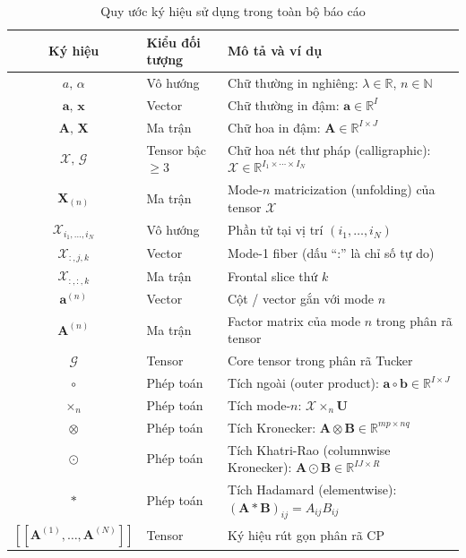 \begin{table}[H]
\centering
\caption{Quy ước ký hiệu sử dụng trong toàn bộ báo cáo}
\label{tab:notation}
\renewcommand{\arraystretch}{1.35}
\begin{tabular}{clL{7.2cm}}
\toprule
\textbf{Ký hiệu} & \textbf{Kiểu đối tượng} & \textbf{Mô tả và ví dụ} \\
\midrule
$a,\, \alpha$ & Vô hướng & Chữ thường in nghiêng: $\lambda \in \mathbb{R}$, $n \in \mathbb{N}$ \\
$\mathbf{a},\, \mathbf{x}$ & Vector & Chữ thường in đậm: $\mathbf{a} \in \mathbb{R}^I$ \\
$\mathbf{A},\, \mathbf{X}$ & Ma trận & Chữ hoa in đậm: $\mathbf{A} \in \mathbb{R}^{I \times J}$ \\
$\mathcal{X},\, \mathcal{G}$ & Tensor bậc $\geq 3$ & Chữ hoa nét thư pháp (calligraphic): $\mathcal{X} \in \mathbb{R}^{I_1 \times \cdots \times I_N}$ \\
\addlinespace
$\mathbf{X}_{(n)}$ & Ma trận & Mode-$n$ matricization (unfolding) của tensor $\mathcal{X}$ \\
$\mathcal{X}_{i_1,\ldots,i_N}$ & Vô hướng & Phần tử tại vị trí $(i_1,\ldots,i_N)$ \\
$\mathcal{X}_{:,j,k}$ & Vector & Mode-1 fiber (dấu ``:'' là chỉ số tự do) \\
$\mathcal{X}_{:,:,k}$ & Ma trận & Frontal slice thứ $k$ \\
\addlinespace
$\mathbf{a}^{(n)}$ & Vector & Cột / vector gắn với mode $n$ \\
$\mathbf{A}^{(n)}$ & Ma trận & Factor matrix của mode $n$ trong phân rã tensor \\
$\mathcal{G}$ & Tensor & Core tensor trong phân rã Tucker \\
\addlinespace
$\circ$ & Phép toán & Tích ngoài (outer product): $\mathbf{a} \circ \mathbf{b} \in \mathbb{R}^{I \times J}$ \\
$\times_n$ & Phép toán & Tích mode-$n$: $\mathcal{X} \times_n \mathbf{U}$ \\
$\otimes$ & Phép toán & Tích Kronecker: $\mathbf{A} \otimes \mathbf{B} \in \mathbb{R}^{mp \times nq}$ \\
$\odot$ & Phép toán & Tích Khatri-Rao (columnwise Kronecker): $\mathbf{A} \odot \mathbf{B} \in \mathbb{R}^{IJ \times R}$ \\
$\ast$ & Phép toán & Tích Hadamard (elementwise): $(\mathbf{A} \ast \mathbf{B})_{ij} = A_{ij} B_{ij}$ \\
\addlinespace
$[\![\mathbf{A}^{(1)},\ldots,\mathbf{A}^{(N)}]\!]$ & Tensor & Ký hiệu rút gọn phân rã CP \\

\end{tabular}
\end{table}
